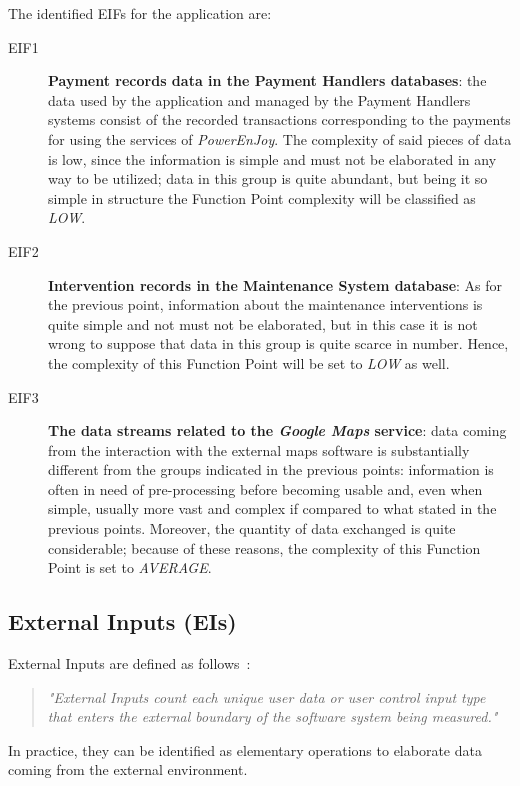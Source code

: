 The identified EIFs for the application are:
\begin{description}
\item[EIF1] \textbf{Payment records data in the Payment Handlers databases}: the data used by the application and managed by the Payment Handlers systems consist of the recorded transactions corresponding to the payments for using the services of \textit{PowerEnJoy}. The complexity of said pieces of data is low, since the information is simple and must not be elaborated in any way to be utilized; data in this group is quite abundant, but being it so simple in structure the Function Point complexity will be classified as \textit{LOW}.
\item[EIF2] \textbf{Intervention records in the Maintenance System database}: As for the previous point, information about the maintenance interventions is quite simple and not must not be elaborated, but in this case it is not wrong to suppose that data in this group is quite scarce in number. Hence, the complexity of this Function Point will be set to \textit{LOW} as well.
\item[EIF3] \textbf{The data streams related to the \textit{Google Maps} service}: data coming from the interaction with the external maps software is substantially different from the groups indicated in the previous points: information is often in need of pre-processing before becoming usable and, even when simple, usually more vast and complex if compared to what stated in the previous points. Moreover, the quantity of data exchanged is quite considerable; because of these reasons, the complexity of this Function Point is set to \textit{AVERAGE}.
\end{description}

\subsection{External Inputs (EIs)}
External Inputs are defined as follows~\cite{cocomo-manual}:
\begin{quotation}
\textit{"External Inputs count each unique user data or user control input type that enters the external boundary of the software system being measured."}
\end{quotation}
In practice, they can be identified as elementary operations to elaborate data coming from the external environment.

